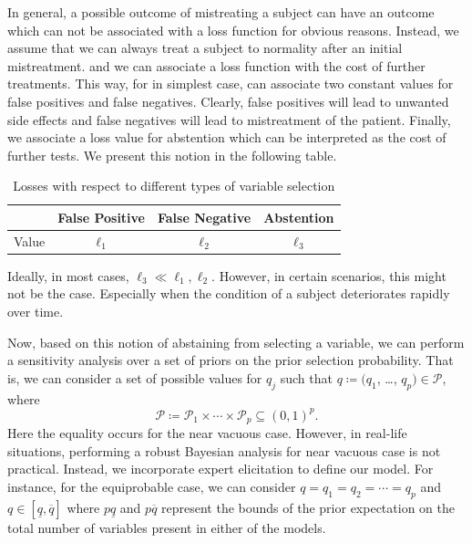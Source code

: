 \documentclass[oribibl]{llncs}
\begin{document}
In general, a possible outcome of mistreating a subject can have an outcome
which can not be associated with a loss function for obvious reasons. Instead, we
assume that we can always treat a subject to normality after an initial mistreatment.
and we can associate a loss function with the cost of further treatments. This way, 
for in simplest case, can associate two constant values for false positives and
false negatives. Clearly, false positives will lead to unwanted side effects and
false negatives will lead to mistreatment of the patient. Finally, we associate
a loss value for abstention which can be interpreted as the cost of further tests.
We present this notion in the following table.
\begin{table}[h]
    \centering
    \begin{tabular}{l|ccc}
       &  False Positive & False Negative & Abstention \\
       \hline
       Value  &  $\ell_1$ & $\ell_2$ & $\ell_3$
    \end{tabular}
    \caption{Losses with respect to different types of variable selection}
    \label{tab:loss:vs}
\end{table}
Ideally, in most cases, $\ell_3\ll \ell_1,\ell_2$. However, in certain scenarios,
this might not be the case. Especially when the condition of a subject deteriorates rapidly
over time.

Now, based on this notion of abstaining from selecting a variable, we can perform
a sensitivity analysis over a set of priors on the prior selection probability.
That is, we can consider a set of possible values for $q_j$ such that
$q\coloneqq(q_1$, \dots, $q_p)\in\mathcal{P}$, where
\begin{equation}
	\mathcal{P} \coloneqq \mathcal{P}_1\times\cdots\times\mathcal{P}_p\subseteq \left(0, 1\right)^{p}.
\end{equation}
Here the equality occurs for the near vacuous case. However, in real-life
situations, performing a robust Bayesian analysis for near vacuous case is 
not practical. Instead, we incorporate expert elicitation to define our model.
For instance, for the equiprobable case, we can consider $q = q_1=q_2=\cdots = q_p$
and $q\in \left[\underline{q}, \overline{q}\right]$
where $p\underline{q}$ and $p\overline{q}$ represent the bounds of the prior expectation on the
total number of variables present in either of the models.
\end{document}
